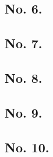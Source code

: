 \documentclass[a4paper]{article}
\begin{document}
{%
\parindent 0pt
\noindent
\ifx\preLilyPondExample \undefined
\else
  \expandafter\preLilyPondExample
\fi
\def\lilypondbook{}%

\ifx\postLilyPondExample \undefined
\else
  \expandafter\postLilyPondExample
\fi
}



\subsection{No. 6.}

{%
\parindent 0pt
\noindent
\ifx\preLilyPondExample \undefined
\else
  \expandafter\preLilyPondExample
\fi
\def\lilypondbook{}%

\ifx\postLilyPondExample \undefined
\else
  \expandafter\postLilyPondExample
\fi
}


\subsection{No. 7.}

{%
\parindent 0pt
\noindent
\ifx\preLilyPondExample \undefined
\else
  \expandafter\preLilyPondExample
\fi
\def\lilypondbook{}%

\ifx\postLilyPondExample \undefined
\else
  \expandafter\postLilyPondExample
\fi
}



\subsection{No. 8.}

{%
\parindent 0pt
\noindent
\ifx\preLilyPondExample \undefined
\else
  \expandafter\preLilyPondExample
\fi
\def\lilypondbook{}%

\ifx\postLilyPondExample \undefined
\else
  \expandafter\postLilyPondExample
\fi
}


\subsection{No. 9.}

{%
\parindent 0pt
\noindent
\ifx\preLilyPondExample \undefined
\else
  \expandafter\preLilyPondExample
\fi
\def\lilypondbook{}%

\ifx\postLilyPondExample \undefined
\else
  \expandafter\postLilyPondExample
\fi
}


\subsection{No. 10.}

{%
\parindent 0pt
\noindent
\ifx\preLilyPondExample \undefined
\else
  \expandafter\preLilyPondExample
\fi
\def\lilypondbook{}%

\ifx\postLilyPondExample \undefined
\else
  \expandafter\postLilyPondExample
\fi
}
\end{document}
